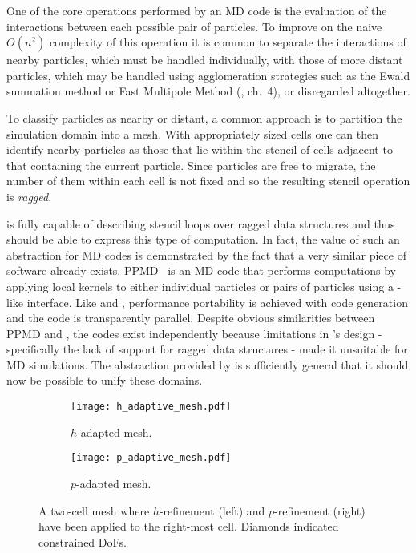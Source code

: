 \documentclass[thesis]{subfiles}
\begin{document}
\begin{description}
    One of the core operations performed by an MD code is the evaluation of the interactions between each possible pair of particles.
    To improve on the naive $O(n^2)$ complexity of this operation it is common to separate the interactions of nearby particles, which must be handled individually, with those of more distant particles, which may be handled using agglomeration strategies such as the Ewald summation method or Fast Multipole Method (\cite{saundersDevelopmentPerformancePortableFramework2019}, ch.~4), or disregarded altogether.

    To classify particles as nearby or distant, a common approach is to partition the simulation domain into a mesh.
    With appropriately sized cells one can then identify nearby particles as those that lie within the stencil of cells adjacent to that containing the current particle.
    Since particles are free to migrate, the number of them within each cell is not fixed and so the resulting stencil operation is \emph{ragged}.

     is fully capable of describing stencil loops over ragged data structures and thus should be able to express this type of computation.
    In fact, the value of such an abstraction for MD codes is demonstrated by the fact that a very similar piece of software already exists.
    PPMD~\cite{saundersDomainSpecificLanguage2018} is an MD code that performs computations by applying local kernels to either individual particles or pairs of particles using a -like interface.
    Like  and , performance portability is achieved with code generation and the code is transparently parallel.
    Despite obvious similarities between PPMD and , the codes exist independently because limitations in 's design - specifically the lack of support for ragged data structures - made it unsuitable for MD simulations.
    The abstraction provided by  is sufficiently general that it should now be possible to unify these domains.
\end{description}

\begin{figure}
  \centering
  \begin{subfigure}{.49\textwidth}
    \centering
    \texttt{[image: h\_adaptive\_mesh.pdf]}
    \caption{$h$-adapted mesh.}
    \label{fig:h_adaptive_mesh}
  \end{subfigure}
  \begin{subfigure}{.49\textwidth}
    \centering
    \texttt{[image: p\_adaptive\_mesh.pdf]}
    \caption{$p$-adapted mesh.}
  \end{subfigure}

  \caption{
    A two-cell mesh where $h$-refinement (left) and $p$-refinement (right) have been applied to the right-most cell.
    Diamonds indicated constrained DoFs.
  }
  \label{fig:adaptive_mesh}
\end{figure}
\end{document}
